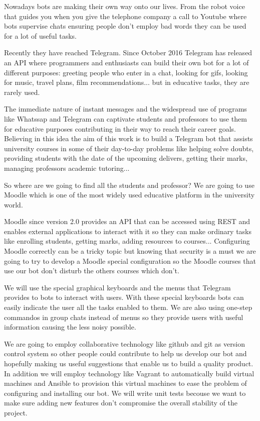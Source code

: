 Nowadays bots are making their own way onto our lives. From the robot voice that guides you when you give the telephone company a call  to Youtube where bots supervise chats ensuring people don't employ bad words they can be used for a lot of useful tasks.

\par

Recently they have reached Telegram. Since October 2016 Telegram has released an API where programmers and enthusiasts can build their own bot for a lot of different purposes: greeting people who enter in a chat, looking for gifs, looking for music, travel plans, film recommendations... but in educative tasks, they are rarely used.

\par

The immediate nature of instant messages and the widespread use of programs like Whatssap and Telegram can captivate students and professors to  use them for educative purposes contributing in their way to reach their career goals. Believing in this idea the aim of this work is to build a Telegram bot that assists university courses in some of their day-to-day problems like helping solve doubts, providing students with the date of the upcoming delivers, getting their marks, managing professors academic tutoring... 
\par
So where are we going to find all the students and professor? We are going to use Moodle which is one of the most widely used educative platform in the university world.
\par
Moodle since version 2.0 provides an API that can be accessed using REST and enables external applications to interact with it so they can  make ordinary tasks like enrolling students, getting marks, adding resources to courses... Configuring Moodle correctly can be a tricky topic but knowing that security is a must we are going to try to develop a Moodle special configuration so the Moodle courses that use our bot don't disturb the others courses which don't.
\par 
We will use the special graphical keyboards and the menus that Telegram provides to bots to interact with users. With these special keyboards bots can easily indicate the user all the tasks enabled to them. We are also using one-step commandos in group chats instead of menus so they provide users with useful information causing the less noisy possible.
\par
We are going to employ collaborative technology like github and git as version control system so other people could contribute to help us develop our bot and hopefully making us useful suggestions that enable us to build a quality product. In addition we will employ technology like Vagrant to automatically build virtual machines and Ansible to provision this virtual machines to ease the problem of configuring and installing our bot. We will write unit tests becouse we want to make sure adding new features don't compromise the overall stability of the project.
\par

